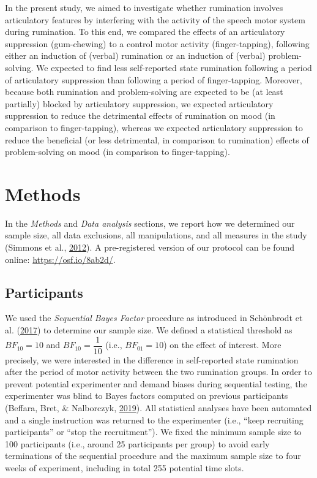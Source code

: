 \documentclass[a4paper,12pt,twoside,openright,oldfontcommands,final]{memoir}
\begin{document}
In the present study, we aimed to investigate whether rumination involves articulatory features by interfering with the activity of the speech motor system during rumination. To this end, we compared the effects of an articulatory suppression (gum-chewing) to a control motor activity (finger-tapping), following either an induction of (verbal) rumination or an induction of (verbal) problem-solving. We expected to find less self-reported state rumination following a period of articulatory suppression than following a period of finger-tapping. Moreover, because both rumination and problem-solving are expected to be (at least partially) blocked by articulatory suppression, we expected articulatory suppression to reduce the detrimental effects of rumination on mood (in comparison to finger-tapping), whereas we expected articulatory suppression to reduce the beneficial (or less detrimental, in comparison to rumination) effects of problem-solving on mood (in comparison to finger-tapping).

\hypertarget{methods-4}{%
\section{Methods}\label{methods-4}}

In the \emph{Methods} and \emph{Data analysis} sections, we report how we determined our sample size, all data exclusions, all manipulations, and all measures in the study (Simmons et al., \protect\hyperlink{ref-simmons_21_2012}{2012}). A pre-registered version of our protocol can be found online: \url{https://osf.io/8ab2d/}.

\hypertarget{participants-3}{%
\subsection{Participants}\label{participants-3}}

We used the \emph{Sequential Bayes Factor} procedure as introduced in Schönbrodt et al. (\protect\hyperlink{ref-schonbrodt_sequential_2017}{2017}) to determine our sample size. We defined a statistical threshold as \(BF_{10} = 10\) and \(BF_{10} = \dfrac{1}{10}\) (i.e., \(BF_{01} = 10\)) on the effect of interest. More precisely, we were interested in the difference in self-reported state rumination after the period of motor activity between the two rumination groups. In order to prevent potential experimenter and demand biases during sequential testing, the experimenter was blind to Bayes factors computed on previous participants (Beffara, Bret, \& Nalborczyk, \protect\hyperlink{ref-beffara_fully_2019}{2019}). All statistical analyses have been automated and a single instruction was returned to the experimenter (i.e., \enquote{keep recruiting participants} or \enquote{stop the recruitment}). We fixed the minimum sample size to 100 participants (i.e., around 25 participants per group) to avoid early terminations of the sequential procedure and the maximum sample size to four weeks of experiment, including in total 255 potential time slots.
\end{document}
